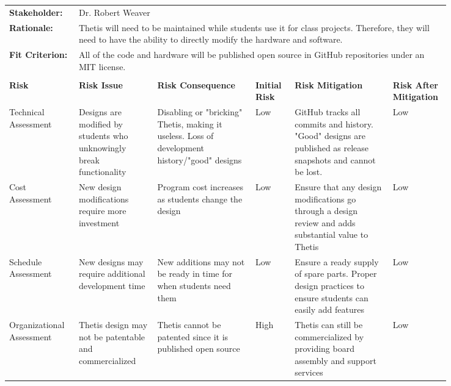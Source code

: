 \begin{landscape}
{\begin{longtable}{| p{0.12\linewidth} | p{0.16\linewidth} |  p{0.20\linewidth} | p{0.08\linewidth} | p{0.20\linewidth} | p{0.08\linewidth} |}
	\hline
	\rowcolor[gray]{0.8}
	\multicolumn{6}{|c|}{ } \\
	\hline
	\textbf{Stakeholder:} & \multicolumn{5}{|l|}{Dr. Robert Weaver} \\
	\hline
	\textbf{Rationale:} & \multicolumn{5}{|p{0.8\linewidth}|}{Thetis will need to be maintained while students use it for class projects. Therefore, they will need to have the ability to directly modify the hardware and software.} \\
	\hline
	\textbf{Fit Criterion:} & \multicolumn{5}{|p{0.8\linewidth}|}{All of the code and hardware will be published open source in GitHub repositories under an MIT license.} \\
	\hline
	\rowcolor[gray]{0.8}
	\multicolumn{6}{|c|}{ } \\
	\hline
	\textbf{Risk} & \textbf{Risk Issue} & \textbf{Risk Consequence} & \textbf{Initial Risk} & \textbf{Risk Mitigation} & \textbf{Risk \newline After \newline Mitigation} \\
	\hline
	Technical \newline Assessment & Designs are modified by students who unknowingly break functionality & Disabling or "bricking" Thetis, making it useless. \newline Loss of development history/"good" designs & \cellcolor{green} Low & GitHub tracks all commits and history. \newline "Good" designs are published as release snapshots and cannot be lost. & \cellcolor{green} Low \\
	\hline
	Cost \newline Assessment & New design modifications require more investment & Program cost increases as students change the design & \cellcolor{green} Low & Ensure that any design modifications go through a design review and adds substantial value to Thetis & \cellcolor{green} Low \\
	\hline
	Schedule \newline Assessment & New designs may require additional development time & New additions may not be ready in time for when students need them & \cellcolor{green} Low & Ensure a ready supply of spare parts. \newline Proper design practices to ensure students can easily add features & \cellcolor{green} Low \\
	\hline
	Organizational \newline Assessment & Thetis design may not be patentable and commercialized & Thetis cannot be patented since it is published open source & \cellcolor{red} High & Thetis can still be commercialized by providing board assembly and support services & \cellcolor{green} Low \\

\end{longtable}}
\end{landscape}

